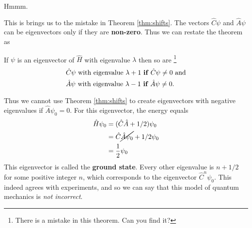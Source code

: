 Hmmm.

This is brings us to the mistake in Theorem \ref{thm:shifts}. The vectors $\hat{C} \psi$ and $\hat{A} \psi$ can be eigenvectors only if they are \textbf{non-zero}. Thus we can restate the theorem as
\begin{thm}
	If $\psi$ is an eigenvector of $\hat{H}$ with eigenvalue $\lambda$ then so are
	 \footnote{There is a mistake in this theorem. Can you find it?}
	\begin{align*}
		&\hat{C} \psi \mbox{ with eigenvalue } \lambda + 1  \mbox{ {\bf if $\hat{C} \psi \neq 0$} and} \\
		&\hat{A} \psi \mbox{ with eigenvalue } \lambda - 1 \mbox{ {\bf if $\hat{A} \psi \neq 0$}}.
	\end{align*}
\end{thm}

Thus we cannot use Theorem \ref{thm:shifts} to create eigenvectors with negative eigenvalues if $\hat{A} \psi_0 = 0$. For this eigenvector, the energy equals
\begin{align*}
	\hat{H} \psi_0
	&= (\hat{C} \hat{A} + 1/2) \psi_0 \\
	&= \hat{C} \cancel{\hat{A} \psi_0} + 1/2 \psi_0 \\
	&= \frac{1}{2} \psi_0
\end{align*}
This eigenvector is called the \textbf{ground state}.
Every other eigenvalue is $n + 1/2$ for some positive integer $n$, which corresponds to the eigenvector $\hat{C}^n \psi_0$. This indeed agrees with experiments, and so we can say that this model of quantum mechanics is \emph{not incorrect}.

